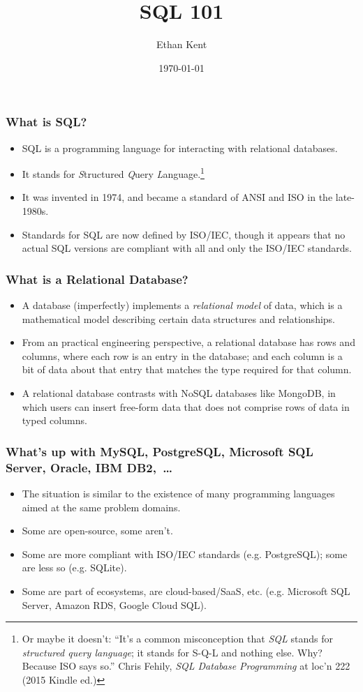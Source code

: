 \documentclass[aspectratio=169]{beamer}
\title{SQL 101}
\author{Ethan Kent}
\institute{Spoonflower}
\date{\today}
\begin{document}
\frame{\titlepage}

\begin{frame}
  \frametitle{What is SQL?}
  \begin{itemize}
    \item SQL is a programming language for interacting with relational databases.
    \item It stands for \emph{S}tructured \emph{Q}uery
          \emph{L}anguage.\footnote{Or maybe it doesn't: ``It's a common
            misconception that \textit{SQL} stands for \textit{structured query
              language}; it stands for S-Q-L and nothing else. Why? Because ISO
            says so.'' Chris Fehily, \textit{SQL Database Programming} at loc'n
            222 (2015 Kindle ed.)}
    \item It was invented in 1974, and became a standard of ANSI and ISO in
          the late-1980s.
    \item Standards for SQL are now defined by ISO/IEC, though it appears that
          no actual SQL versions are compliant with all and only the ISO/IEC
          standards.
  \end{itemize}
\end{frame}

\begin{frame}
  \frametitle{What is a Relational Database?}
  \begin{itemize}
    \item A database (imperfectly) implements a \textit{relational model} of
          data, which is a mathematical model describing certain data
          structures and relationships.
    \item From an practical engineering perspective, a relational database
          has rows and columns, where each row is an entry in the database; and
          each column is a bit of data about that entry that matches the type
          required for that column.
    \item A relational database contrasts with NoSQL databases like MongoDB,
          in which users can insert free-form data that does not comprise
          rows of data in typed columns.
  \end{itemize}
\end{frame}

\begin{frame}
  \frametitle{What's up with MySQL, PostgreSQL, Microsoft SQL Server, Oracle, IBM DB2,~\ldots}
  \begin{itemize}
    \item The situation is similar to the existence of many programming
          languages aimed at the same problem domains.
    \item Some are open-source, some aren't.
    \item Some are more compliant with ISO/IEC standards (e.g. PostgreSQL);
          some are less so (e.g. SQLite).
    \item Some are part of ecosystems, are cloud-based/SaaS, etc. (e.g. Microsoft SQL
          Server, Amazon RDS, Google Cloud SQL).
  \end{itemize}
\end{frame}
\end{document}
